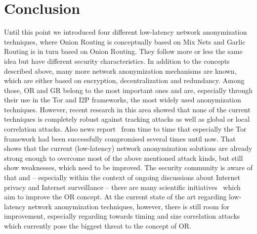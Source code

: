 \documentclass{sig-alternate}
\begin{document}
\section{Conclusion}
Until this point we introduced four different low-latency network anonymization techniques, where Onion Routing is conceptually based on Mix Nets and Garlic Routing is in turn based on Onion Routing. They follow more or less the same idea but have different security characteristics. In addition to the concepts described above, many more network anonymization mechanisms are known, which are either based on encryption, decentralization and redundancy. Among those, OR and GR belong to the most important ones and are, especially through their use in the Tor and I2P frameworks, the most widely used anonymization techniques. However, recent research in this area showed that none of the current techniques is completely robust against tracking attacks as well as global or local correlation attacks. Also news report~\cite{torhacked} from time to time that especially the Tor framework had been successfully compromised several times until now. That shows that the current (low-latency) network anonymization solutions are already strong enough to overcome most of the above mentioned attack kinds, but still show weaknesses, which need to be improved. The security community is aware of that and -- especially within the context of ongoing discussions about Internet privacy and Internet surveillance -- there are many scientific initiatives~\cite{ORpublications} which aim to improve the OR concept. At the current state of the art regarding low-latency network anonymization techniques, however, there is still room for improvement, especially regarding towards timing and size correlation attacks which currently pose the biggest threat to the concept of OR.

\newpage


\end{document}
